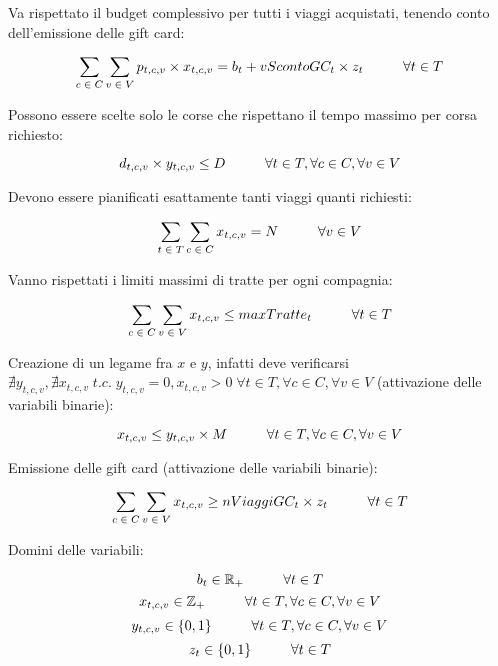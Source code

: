 \documentclass[main.tex]{subfiles}
\begin{document}
Va rispettato il budget complessivo per tutti i viaggi acquistati, tenendo conto dell'emissione delle gift card:
\begin{tcolorbox}
$$\sum_{c\; \in\; C} \sum_{v\; \in\; V} p_{t,c,v} \times{} x_{t,c,v} = b_t + vScontoGC_t \times{} z_t \hspace{10mm} \forall{} t \in T$$
\end{tcolorbox}

Possono essere scelte solo le corse che rispettano il tempo massimo per corsa richiesto:
\begin{tcolorbox}
$$d_{t,c,v} \times{} y_{t,c,v} \leq D \hspace{10mm} \forall{} t \in T, \forall{} c \in C, \forall{} v \in V$$
\end{tcolorbox}

Devono essere pianificati esattamente tanti viaggi quanti richiesti:
\begin{tcolorbox}
$$\sum_{t\; \in\; T} \sum_{c\; \in\; C} x_{t,c,v} = N \hspace{10mm} \forall{} v \in V$$
\end{tcolorbox}

Vanno rispettati i limiti massimi di tratte per ogni compagnia:
\begin{tcolorbox}
$$\sum_{c\; \in\; C} \sum_{v\; \in\; V} x_{t,c,v} \leq maxTratte_t \hspace{10mm} \forall{} t \in T$$
\end{tcolorbox}

Creazione di un legame fra $x$ e $y$, infatti deve verificarsi $\nexists y_{t,c,v}, \nexists x_{t,c,v}\; t.c.\; y_{t,c,v} = 0, x_{t,c,v} > 0\; \forall{} t \in T, \forall{} c \in C, \forall{} v \in V$ (attivazione delle variabili binarie):
\begin{tcolorbox}
$$x_{t,c,v} \leq y_{t,c,v} \times{} M \hspace{10mm} \forall{} t \in T, \forall{} c \in C, \forall{} v \in V$$
\end{tcolorbox}

Emissione delle gift card (attivazione delle variabili binarie):
\begin{tcolorbox}
$$\sum_{c\; \in\; C} \sum_{v\; \in\; V} x_{t,c,v} \geq nViaggiGC_t \times z_t \hspace{10mm} \forall{} t \in T$$
\end{tcolorbox}

Domini delle variabili:
\begin{tcolorbox}
$$b_t \in \mathbb{R}_+ \hspace{10mm} \forall{} t \in T$$
$$x_{t,c,v} \in \mathbb{Z}_+ \hspace{10mm} \forall{} t \in T, \forall{} c \in C, \forall{} v \in V$$
$$y_{t,c,v} \in \{0,1\} \hspace{10mm} \forall{} t \in T, \forall{} c \in C, \forall{} v \in V$$
$$z_t \in \{0,1\} \hspace{10mm} \forall{} t \in T$$
\end{tcolorbox}
\end{document}
